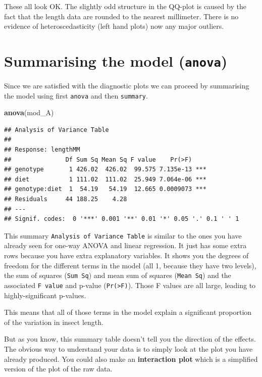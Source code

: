 \documentclass[
  a4paperpaper,
]{book}
\newenvironment{Shaded}{\begin{snugshade}}{\end{snugshade}}
\newcommand{\KeywordTok}[1]{\textcolor[rgb]{0.13,0.29,0.53}{\textbf{#1}}}
\newcommand{\NormalTok}[1]{#1}
\begin{document}
These all look OK. The slightly odd structure in the QQ-plot is caused by the fact that the length data are rounded to the nearest millimeter. There is no evidence of heteroscedasticity (left hand plots) now any major outliers.

\hypertarget{summarising-the-model-anova}{%
\section{\texorpdfstring{Summarising the model (\texttt{anova})}{Summarising the model (anova)}}\label{summarising-the-model-anova}}

Since we are satisfied with the diagnostic plots we can proceed by summarising the model using first \texttt{anova} and then \texttt{summary}.

\begin{Shaded}
\begin{Highlighting}[]
\KeywordTok{anova}\NormalTok{(mod\_A)}
\end{Highlighting}
\end{Shaded}

\begin{verbatim}
## Analysis of Variance Table
## 
## Response: lengthMM
##               Df Sum Sq Mean Sq F value    Pr(>F)    
## genotype       1 426.02  426.02  99.575 7.135e-13 ***
## diet           1 111.02  111.02  25.949 7.064e-06 ***
## genotype:diet  1  54.19   54.19  12.665 0.0009073 ***
## Residuals     44 188.25    4.28                      
## ---
## Signif. codes:  0 '***' 0.001 '**' 0.01 '*' 0.05 '.' 0.1 ' ' 1
\end{verbatim}

This summary \texttt{Analysis\ of\ Variance\ Table} is similar to the ones you have already seen for one-way ANOVA and linear regression. It just has some extra rows because you have extra explanatory variables. It shows you the degrees of freedom for the different terms in the model (all 1, because they have two levels), the sum of squares (\texttt{Sum\ Sq}) and mean sum of squares (\texttt{Mean\ Sq}) and the associated \texttt{F\ value} and p-value (\texttt{Pr(\textgreater{}F)}). Those F values are all large, leading to highly-significant p-values.

This means that all of those terms in the model explain a significant proportion of the variation in insect length.

But as you know, this summary table doesn't tell you the direction of the effects. The obvious way to understand your data is to simply look at the plot you have already produced. You could also make an \textbf{interaction plot} which is a simplified version of the plot of the raw data.
\end{document}
